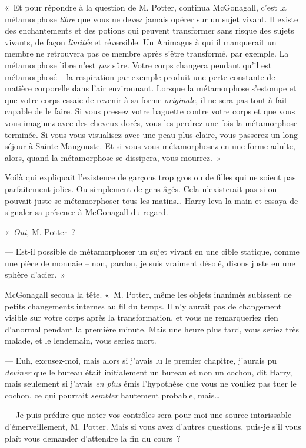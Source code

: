 «~Et pour répondre à la question de M. Potter, continua McGonagall, c'est la métamorphose \emph{libre} que vous ne devez jamais opérer sur un sujet vivant.
Il existe des enchantements et des potions qui peuvent transformer sans risque des sujets vivants, de façon \emph{limitée} et réversible.
Un Animagus à qui il manquerait un membre ne retrouvera pas ce membre après s'être transformé, par exemple.
La métamorphose libre n'est \emph{pas} sûre.
Votre corps changera pendant qu'il est métamorphosé -- la respiration par exemple produit une perte constante de matière corporelle dans l'air environnant.
Lorsque la métamorphose s'estompe et que votre corps essaie de revenir à sa forme \emph{originale}, il ne sera pas tout à fait capable de le faire.
Si vous pressez votre baguette contre votre corps et que vous vous imaginez avec des cheveux dorés, vous les perdrez une fois la métamorphose terminée.
Si vous vous visualisez avec une peau plus claire, vous passerez un long séjour à Sainte Mangouste.
Et si vous vous métamorphosez en une forme adulte, alors, quand la métamorphose se dissipera, vous mourrez.~»

Voilà qui expliquait l'existence de garçons trop gros ou de filles qui ne soient pas parfaitement jolies.
Ou simplement de gens âgés.
Cela n'existerait pas si on pouvait juste se métamorphoser tous les matins…
Harry leva la main et essaya de signaler sa présence à McGonagall du regard.

«~\emph{Oui}, M. Potter~?

--- Est-il possible de métamorphoser un sujet vivant en une cible statique, comme une pièce de monnaie -- non, pardon, je suis vraiment désolé, disons juste en une sphère d'acier.~»

McGonagall secoua la tête.
«~M. Potter, même les objets inanimés subissent de petits changements internes au fil du temps.
Il n'y aurait pas de changement visible sur votre corps après la transformation, et vous ne remarqueriez rien d'anormal pendant la première minute.
Mais une heure plus tard, vous seriez très malade, et le lendemain, vous seriez mort.

--- Euh, excusez-moi, mais alors si j'avais lu le premier chapitre, j'aurais pu \emph{deviner} que le bureau était initialement un bureau et non un cochon, dit Harry, mais seulement si j'avais \emph{en plus} émis l'hypothèse que vous ne vouliez pas tuer le cochon, ce qui pourrait \emph{sembler} hautement probable, mais…

--- Je puis prédire que noter vos contrôles sera pour moi une source intarissable d'émerveillement, M. Potter.
Mais si vous avez d'autres questions, puis-je s'il vous plaît vous demander d'attendre la fin du cours~?

